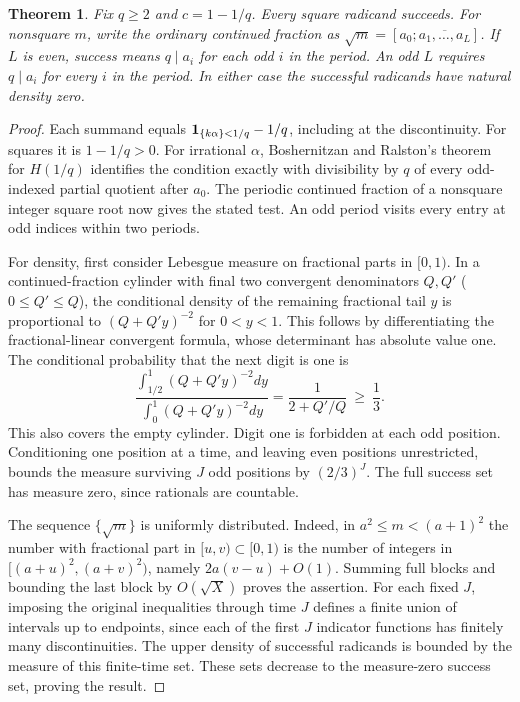 \documentclass[11pt,letterpaper]{article}
\newtheorem{theorem}{Theorem}
\begin{document}
\begin{theorem}\label{th:curbed}
Fix \(q\ge2\) and \(c=1-1/q\). Every square radicand succeeds. For nonsquare \(m\), write the ordinary continued fraction as \(\sqrt m=[a_0;\overline{a_1,\ldots,a_L}]\). If \(L\) is even, success means \(q\mid a_i\) for each odd \(i\) in the period. An odd \(L\) requires \(q\mid a_i\) for every \(i\) in the period. In either case the successful radicands have natural density zero.
\end{theorem}
\begin{proof}
Each summand equals \({\bf1}_{\{k\alpha\}<1/q}-1/q\), including at the discontinuity. For squares it is \(1-1/q>0\). For irrational \(\alpha\), Boshernitzan and Ralston's theorem for \(H(1/q)\) identifies the condition exactly with divisibility by \(q\) of every odd-indexed partial quotient after \(a_0\). The periodic continued fraction of a nonsquare integer square root now gives the stated test. An odd period visits every entry at odd indices within two periods.

For density, first consider Lebesgue measure on fractional parts in \([0,1)\). In a continued-fraction cylinder with final two convergent denominators \(Q,Q'\) (\(0\le Q'\le Q\)), the conditional density of the remaining fractional tail \(y\) is proportional to \((Q+Q'y)^{-2}\) for \(0<y<1\). This follows by differentiating the fractional-linear convergent formula, whose determinant has absolute value one. The conditional probability that the next digit is one is
\[
 \frac{\int_{1/2}^{1}(Q+Q'y)^{-2}dy}
      {\int_0^1(Q+Q'y)^{-2}dy}=\frac{1}{2+Q'/Q}\ \ge\ \frac13.
\]
This also covers the empty cylinder. Digit one is forbidden at each odd position. Conditioning one position at a time, and leaving even positions unrestricted, bounds the measure surviving \(J\) odd positions by \((2/3)^J\). The full success set has measure zero, since rationals are countable.

The sequence \(\{\sqrt m\}\) is uniformly distributed. Indeed, in \(a^2\le m<(a+1)^2\) the number with fractional part in \([u,v)\subset[0,1)\) is the number of integers in \([(a+u)^2,(a+v)^2)\), namely \(2a(v-u)+O(1)\). Summing full blocks and bounding the last block by \(O(\sqrt X)\) proves the assertion. For each fixed \(J\), imposing the original inequalities through time \(J\) defines a finite union of intervals up to endpoints, since each of the first \(J\) indicator functions has finitely many discontinuities. The upper density of successful radicands is bounded by the measure of this finite-time set. These sets decrease to the measure-zero success set, proving the result.
\end{proof}
\end{document}

